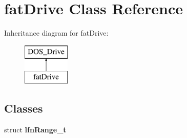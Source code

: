 \hypertarget{classfatDrive}{\section{fat\-Drive Class Reference}
\label{classfatDrive}
}
Inheritance diagram for fat\-Drive\-:\begin{figure}[H]
\begin{center}
\leavevmode
\includegraphics[height=2.000000cm]{classfatDrive}
\end{center}
\end{figure}
\subsection*{Classes}
\begin{DoxyCompactItemize}
\item 
struct {\bfseries lfn\-Range\-\_\-t}
\end{DoxyCompactItemize}
